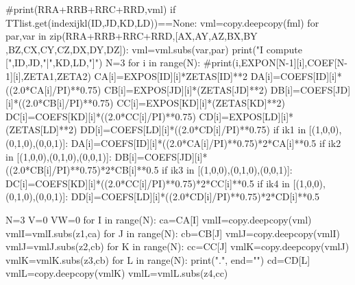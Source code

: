                     #print(RRA+RRB+RRC+RRD,vml)                    
                    if TTlist.get(indexijkl(ID,JD,KD,LD))==None:
                        vml=copy.deepcopy(fml)    
                        for par,var in zip(RRA+RRB+RRC+RRD,[AX,AY,AZ,BX,BY
                                                            ,BZ,CX,CY,CZ,DX,DY,DZ]):
                            vml=vml.subs(var,par)
                        print("I compute [",ID,JD,"|",KD,LD,"]")
                        N=3
                        for i in range(N):
                            #print(i,EXPON[N-1][i],COEF[N-1][i],ZETA1,ZETA2)
                            CA[i]=EXPOS[ID][i]*ZETAS[ID]**2
                            DA[i]=COEFS[ID][i]*((2.0*CA[i]/PI)**0.75)
                            CB[i]=EXPOS[JD][i]*(ZETAS[JD]**2)
                            DB[i]=COEFS[JD][i]*((2.0*CB[i]/PI)**0.75)
                            CC[i]=EXPOS[KD][i]*(ZETAS[KD]**2)
                            DC[i]=COEFS[KD][i]*((2.0*CC[i]/PI)**0.75)
                            CD[i]=EXPOS[LD][i]*(ZETAS[LD]**2)
                            DD[i]=COEFS[LD][i]*((2.0*CD[i]/PI)**0.75)
                            if ik1 in [(1,0,0),(0,1,0),(0,0,1)]:
                                DA[i]=COEFS[ID][i]*((2.0*CA[i]/PI)**0.75)*2*CA[i]**0.5
                            if ik2 in [(1,0,0),(0,1,0),(0,0,1)]:
                                DB[i]=COEFS[JD][i]*((2.0*CB[i]/PI)**0.75)*2*CB[i]**0.5
                            if ik3 in [(1,0,0),(0,1,0),(0,0,1)]:
                                DC[i]=COEFS[KD][i]*((2.0*CC[i]/PI)**0.75)*2*CC[i]**0.5
                            if ik4 in [(1,0,0),(0,1,0),(0,0,1)]:
                                DD[i]=COEFS[LD][i]*((2.0*CD[i]/PI)**0.75)*2*CD[i]**0.5                           
 


                        N=3
                        V=0
                        VW=0
                        for I in range(N):
                            ca=CA[I]
                            vmlI=copy.deepcopy(vml)
                            vmlI=vmlI.subs(z1,ca)
                            for J in range(N):
                                cb=CB[J]
                                vmlJ=copy.deepcopy(vmlI)
                                vmlJ=vmlJ.subs(z2,cb)
                                for K in range(N):
                                    cc=CC[J]
                                    vmlK=copy.deepcopy(vmlJ)
                                    vmlK=vmlK.subs(z3,cb)
                                    for L in range(N):
                                        print(".", end="")
                                        cd=CD[L]
                                        vmlL=copy.deepcopy(vmlK)
                                        vmlL=vmlL.subs(z4,cc)

